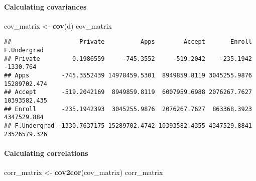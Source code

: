 \documentclass[]{article}
\newenvironment{Shaded}{\begin{snugshade}}{\end{snugshade}}
\newcommand{\KeywordTok}[1]{\textcolor[rgb]{0.13,0.29,0.53}{\textbf{#1}}}
\newcommand{\NormalTok}[1]{#1}
\newcommand{\OperatorTok}[1]{\textcolor[rgb]{0.81,0.36,0.00}{\textbf{#1}}}
\newcommand{\StringTok}[1]{\textcolor[rgb]{0.31,0.60,0.02}{#1}}
\let\oldparagraph\paragraph
\renewcommand{\paragraph}[1]{\oldparagraph{#1}\mbox{}}
\begin{document}
\begin{Shaded}
\end{Shaded}

\hypertarget{calculating-covariances}{%
\paragraph{Calculating covariances}\label{calculating-covariances}}

\begin{Shaded}
\begin{Highlighting}[]
\NormalTok{cov_matrix <-}\StringTok{ }\KeywordTok{cov}\NormalTok{(d)}
\NormalTok{cov_matrix}
\end{Highlighting}
\end{Shaded}

\begin{verbatim}
##                   Private          Apps        Accept       Enroll  F.Undergrad
## Private         0.1986559     -745.3552     -519.2042    -235.1942    -1330.764
## Apps         -745.3552439 14978459.5301  8949859.8119 3045255.9876 15289702.474
## Accept       -519.2042169  8949859.8119  6007959.6988 2076267.7627 10393582.435
## Enroll       -235.1942393  3045255.9876  2076267.7627  863368.3923  4347529.884
## F.Undergrad -1330.7637175 15289702.4742 10393582.4355 4347529.8841 23526579.326
\end{verbatim}

\newpage

\hypertarget{calculating-correlations}{%
\paragraph{Calculating correlations}\label{calculating-correlations}}

\begin{Shaded}
\begin{Highlighting}[]
\NormalTok{corr_matrix <-}\StringTok{ }\KeywordTok{cov2cor}\NormalTok{(cov_matrix)}
\NormalTok{corr_matrix}
\end{Highlighting}
\end{Shaded}
\end{document}
